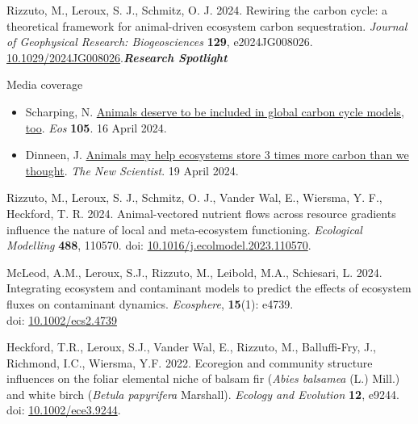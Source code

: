 \begin{etaremune}[topsep=0pt,itemsep=1pt,partopsep=0pt,parsep=0pt]
  \renewcommand\labelenumi{\bfseries\theenumi .}
  \item \textcolor{awesome}{Rizzuto, M.}, Leroux, S. J., Schmitz, O. J. 2024. Rewiring the carbon cycle: a theoretical framework for animal-driven ecosystem carbon sequestration. \emph{Journal of Geophysical Research: Biogeosciences} \textbf{129}, e2024JG008026. \href{https://agupubs.onlinelibrary.wiley.com/doi/epdf/10.1029/2024JG008026?domain=author&token=JQVUWF9NSSQKUTSE44C6}{10.1029/2024JG008026}.\null\hfill\textbf{\textit{Research Spotlight}}
  \begin{description}
    \item[\bodyfontlight Media coverage]
  \end{description}
  \begin{itemize}
      \item Scharping, N. \href{https://doi.org/10.1029/2024EO240170}{Animals deserve to be included in global carbon cycle models, too}. \emph{Eos} \textbf{105}. 16 April 2024.
      \item Dinneen, J. \href{https://www.newscientist.com/article/2427674-animals-may-help-ecosystems-store-3-times-more-carbon-than-we-thought/}{Animals may help ecosystems store 3 times more carbon than we thought}. \emph{The New Scientist}. 19 April 2024.
  \end{itemize}
  \item \textcolor{awesome}{Rizzuto, M.}, Leroux, S. J., Schmitz, O. J., Vander Wal, E., Wiersma, Y. F., Heckford, T. R. 2024. Animal-vectored nutrient flows across resource gradients influence the nature of local and meta-ecosystem functioning. \emph{Ecological Modelling} \textbf{488}, 110570. doi: \href{https://doi.org/10.1016/j.ecolmodel.2023.110570}{10.1016/j.ecolmodel.2023.110570}.
  \item McLeod, A.M., Leroux, S.J., \textcolor{awesome}{Rizzuto, M.}, Leibold, M.A., Schiesari, L. 2024. Integrating ecosystem and contaminant models to predict the effects of ecosystem fluxes on contaminant dynamics. \emph{Ecosphere}, \textbf{15}(1): e4739.\\ doi: \href{https://doi.org/10.1002/ecs2.4739}{10.1002/ecs2.4739}
  \item Heckford, T.R., Leroux, S.J., Vander Wal, E., \textcolor{awesome}{Rizzuto, M.}, Balluffi-Fry, J., Richmond, I.C., Wiersma, Y.F. 2022. Ecoregion and community structure influences on the foliar elemental niche of balsam fir (\textit{Abies balsamea} (L.) Mill.) and white birch (\textit{Betula papyrifera} Marshall). \emph{Ecology and Evolution} \textbf{12}, e9244. doi: \href{https://doi.org/10.1002/ece3.9244}{10.1002/ece3.9244}.

\end{etaremune}
